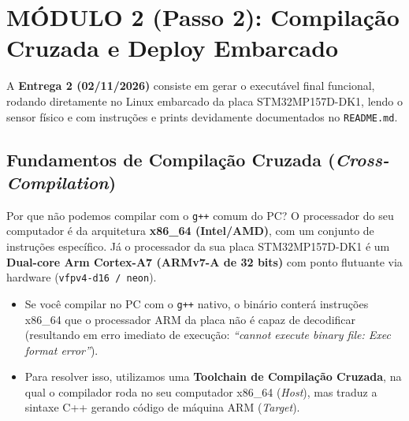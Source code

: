 \documentclass[11pt,a4paper]{article}
\begin{document}
\newpage
\section{MÓDULO 2 (Passo 2): Compilação Cruzada e Deploy Embarcado}

A \textbf{Entrega 2 (02/11/2026)} consiste em gerar o executável final funcional, rodando diretamente no Linux embarcado da placa STM32MP157D-DK1, lendo o sensor físico e com instruções e prints devidamente documentados no \texttt{README.md}.

\subsection{Fundamentos de Compilação Cruzada (\textit{Cross-Compilation})}
\begin{armbox}{Por que não podemos compilar com o \texttt{g++} comum do PC?}
O processador do seu computador é da arquitetura \textbf{x86\_64 (Intel/AMD)}, com um conjunto de instruções específico. Já o processador da sua placa STM32MP157D-DK1 é um \textbf{Dual-core Arm Cortex-A7 (ARMv7-A de 32 bits)} com ponto flutuante via hardware (\texttt{vfpv4-d16 / neon}).
\begin{itemize}[leftmargin=*]
    \item Se você compilar no PC com o \texttt{g++} nativo, o binário conterá instruções x86\_64 que o processador ARM da placa não é capaz de decodificar (resultando em erro imediato de execução: \textit{``cannot execute binary file: Exec format error''}).
    \item Para resolver isso, utilizamos uma \textbf{Toolchain de Compilação Cruzada}, na qual o compilador roda no seu computador x86\_64 (\textit{Host}), mas traduz a sintaxe C++ gerando código de máquina ARM (\textit{Target}).
\end{itemize}
\end{armbox}
\end{document}
